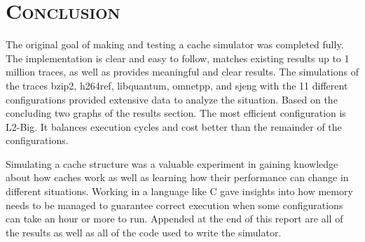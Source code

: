 \documentclass[cacheSimReport.tex]{subfiles}
\begin{document}
\section*{\textsc{\Large Conclusion}}

The original goal of making and testing a cache simulator was completed fully. The implementation is clear and easy to follow, matches existing results up to 1 million traces, as well as provides meaningful and clear results. The simulations of the traces bzip2, h264ref, libquantum, omnetpp, and sjeng with the 11 different configurations provided extensive data to analyze the situation. Based on the concluding two graphs of the results section. The most efficient configuration is L2-Big. It balances execution cycles and cost better than the remainder of the configurations.

Simulating a cache structure was a valuable experiment in gaining knowledge about how caches work as well as learning how their performance can change in different situations. Working in a language like C gave insights into how memory needs to be managed to guarantee correct execution when some configurations can take an hour or more to run. Appended at the end of this report are all of the results as well as all of the code used to write the simulator.
\end{document}
